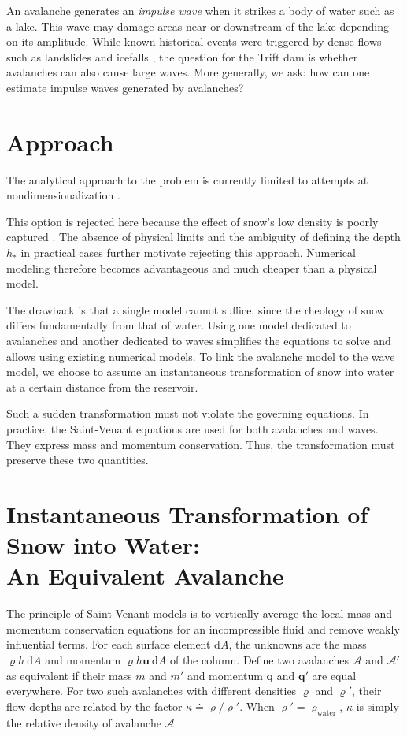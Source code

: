 \documentclass[11pt]{article}
\begin{document}
An avalanche generates an \emph{impulse wave} when it strikes a body of water such as a lake.
This wave may damage areas near or downstream of the lake depending on its amplitude.
While known historical events were triggered by dense flows such as landslides \citep{Vajont} and icefalls \citep{Palcacocha},
the question for the Trift dam is whether avalanches can also cause large waves.
More generally, we ask: how can one estimate impulse waves generated by avalanches?

\section{Approach}

The analytical approach to the problem is currently limited to attempts at nondimensionalization \citep{heller}.

This option is rejected here because the effect of snow's low density is poorly captured \citep{zitti}.
The absence of physical limits and the ambiguity of defining the depth $h_\ast$ in practical cases further motivate rejecting this approach.
Numerical modeling therefore becomes advantageous and much cheaper than a physical model.

The drawback is that a single model cannot suffice, since the rheology of snow differs fundamentally from that of water.
Using one model dedicated to avalanches and another dedicated to waves simplifies the equations to solve and allows using existing numerical models.
To link the avalanche model to the wave model,
we choose to assume an instantaneous transformation of snow into water at a certain distance from the reservoir.

Such a sudden transformation must not violate the governing equations.
In practice, the Saint-Venant equations are used for both avalanches and waves.
They express mass and momentum conservation.
Thus, the transformation must preserve these two quantities.

\section{Instantaneous Transformation of Snow into Water:\\An Equivalent Avalanche}

The principle of Saint-Venant models is to vertically average the local mass and momentum conservation equations for an incompressible fluid and remove weakly influential terms.
For each surface element $\mathrm dA$, the unknowns are the mass $\varrho h~\mathrm dA$ and momentum $\varrho h\bm u~\mathrm dA$ of the column.
Define two avalanches $\mathcal A$ and $\mathcal A'$ as equivalent if their mass $m$ and $m'$ and momentum $\bm q$ and $\bm q'$ are equal everywhere.
For two such avalanches with different densities $\varrho$ and $\varrho'$,
their flow depths are related by the factor $\kappa\doteq\varrho/\varrho'$.
When $\varrho'=\varrho_\text{water}$, $\kappa$ is simply the relative density of avalanche $\mathcal A$.
\end{document}
